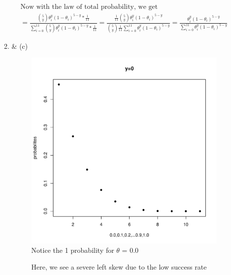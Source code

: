 \documentclass[11pt]{article}
\begin{document}
\begin{enumerate}
\begin{enumerate}
\begin{gather}
		 \text{Now with the law of total probability, we get}\\
		 = \frac{\binom{5}{y} \theta_i^y(1-\theta_i)^{5-y} * \frac{1}{11}}{\sum_{i=0}^{11}\binom{5}{y} \theta_i^y(1-\theta_i)^{5-y} * \frac{1}{11}} = \frac{\frac{1}{11}\binom{5}{y} \theta_i^y(1-\theta_i)^{5-y}}{\binom{5}{y} \frac{1}{11}\sum_{i=0}^{11} \theta_i^y(1-\theta_i)^{5-y}} = \frac{ \theta_i^y(1-\theta_i)^{5-y}}{\sum_{i=0}^{11} \theta_i^y(1-\theta_i)^{5-y}}
	\end{gather}
	\item \& (c)
	\begin{figure}[H]
		\centering
		\caption{Notice the 1 probability for $\theta$ = 0.0}
		\includegraphics[scale=.6]{y=0graph.pdf}
	\end{figure}
	\begin{figure}[H]
		\centering
		\caption{Here, we see a severe left skew due to the low success rate}

\end{figure}
\end{enumerate}
\end{enumerate}
\end{document}
